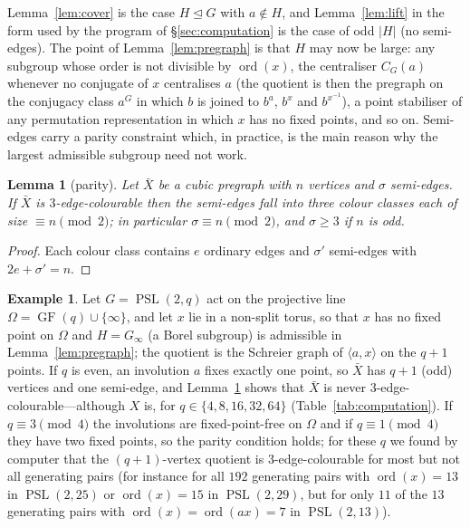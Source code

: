 \documentclass[11pt,a4paper]{article}
\newtheorem{lemma}[theorem]{Lemma}
\theoremstyle{definition}
\newtheorem{example}[theorem]{Example}
\theoremstyle{remark}
\newcommand{\ord}{\operatorname{ord}}
\newcommand{\PSL}{\operatorname{PSL}}
\newcommand{\GF}{\operatorname{GF}}
\begin{document}
Lemma~\ref{lem:cover} is the case $H\trianglelefteq G$ with $a\notin H$, and Lemma~\ref{lem:lift} in the form used by the program of \S\ref{sec:computation} is the case of odd $|H|$ (no semi-edges).  The point of Lemma~\ref{lem:pregraph} is that $H$ may now be large: any subgroup whose order is not divisible by $\ord(x)$, the centraliser $C_G(a)$ whenever no conjugate of $x$ centralises $a$ (the quotient is then the pregraph on the conjugacy class $a^G$ in which $b$ is joined to $b^a$, $b^x$ and $b^{x^{-1}}$), a point stabiliser of any permutation representation in which $x$ has no fixed points, and so on.  Semi-edges carry a parity constraint which, in practice, is the main reason why the largest admissible subgroup need not work.

\begin{lemma}[parity]\label{lem:parity}
Let $\bar X$ be a cubic pregraph with $n$ vertices and $\sigma$ semi-edges.  If $\bar X$ is $3$-edge-colourable then the semi-edges fall into three colour classes each of size $\equiv n\pmod 2$; in particular $\sigma\equiv n\pmod 2$, and $\sigma\ge3$ if $n$ is odd.
\end{lemma}
\begin{proof}
Each colour class contains $e$ ordinary edges and $\sigma'$ semi-edges with $2e+\sigma'=n$.
\end{proof}

\begin{example}\label{ex:projline}
Let $G=\PSL(2,q)$ act on the projective line $\Omega=\GF(q)\cup\{\infty\}$, and let $x$ lie in a non-split torus, so that $x$ has no fixed point on $\Omega$ and $H=G_\infty$ (a Borel subgroup) is admissible in Lemma~\ref{lem:pregraph}; the quotient is the Schreier graph of $\langle a,x\rangle$ on the $q+1$ points.  If $q$ is even, an involution $a$ fixes exactly one point, so $\bar X$ has $q+1$ (odd) vertices and one semi-edge, and Lemma~\ref{lem:parity} shows that $\bar X$ is never $3$-edge-colourable---although $X$ is, for $q\in\{4,8,16,32,64\}$ (Table~\ref{tab:computation}).  If $q\equiv 3\pmod 4$ the involutions are fixed-point-free on $\Omega$ and if $q\equiv1\pmod4$ they have two fixed points, so the parity condition holds; for these $q$ we found by computer that the $(q+1)$-vertex quotient is $3$-edge-colourable for most but not all generating pairs (for instance for all $192$ generating pairs with $\ord(x)=13$ in $\PSL(2,25)$ or $\ord(x)=15$ in $\PSL(2,29)$, but for only $11$ of the $13$ generating pairs with $\ord(x)=\ord(ax)=7$ in $\PSL(2,13)$).
\end{example}
\end{document}
